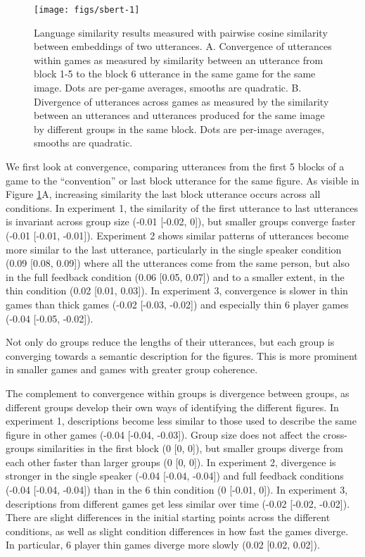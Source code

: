 \documentclass[
  english,
  a4paper,
]{article}
\begin{document}
\begin{figure}[t!]

{\centering \texttt{[image: figs/sbert-1]} 

}

\caption{Language similarity results measured with pairwise cosine similarity between embeddings of two utterances. A. Convergence of utterances within games as measured by similarity between an utterance from block 1-5 to the block 6 utterance in the same game for the same image. Dots are per-game averages, smooths are quadratic. B. Divergence of utterances across games as measured by the similarity between an utterances and utterances produced for the same image by different groups in the same block. Dots are per-image averages, smooths are quadratic.}\label{fig:sbert}
\end{figure}

We first look at convergence, comparing utterances from the first 5 blocks of a game to the ``convention'' or last block utterance for the same figure. As visible in Figure \ref{fig:sbert}A, increasing similarity the last block utterance occurs across all conditions. In experiment 1, the similarity of the first utterance to last utterances is invariant across group size (-0.01 {[}-0.02, 0{]}), but smaller groups converge faster (-0.01 {[}-0.01, -0.01{]}). Experiment 2 shows similar patterns of utterances become more similar to the last utterance, particularly in the single speaker condition (0.09 {[}0.08, 0.09{]}) where all the utterances come from the same person, but also in the full feedback condition (0.06 {[}0.05, 0.07{]}) and to a smaller extent, in the thin condition (0.02 {[}0.01, 0.03{]}). In experiment 3, convergence is slower in thin games than thick games (-0.02 {[}-0.03, -0.02{]}) and especially thin 6 player games (-0.04 {[}-0.05, -0.02{]}).

Not only do groups reduce the lengths of their utterances, but each group is converging towards a semantic description for the figures. This is more prominent in smaller games and games with greater group coherence.

The complement to convergence within groups is divergence between groups, as different groups develop their own ways of identifying the different figures. In experiment 1, descriptions become less similar to those used to describe the same figure in other games (-0.04 {[}-0.04, -0.03{]}). Group size does not affect the cross-groups similarities in the first block (0 {[}0, 0{]}), but smaller groups diverge from each other faster than larger groups (0 {[}0, 0{]}). In experiment 2, divergence is stronger in the single speaker (-0.04 {[}-0.04, -0.04{]}) and full feedback conditions (-0.04 {[}-0.04, -0.04{]}) than in the 6 thin condition (0 {[}-0.01, 0{]}). In experiment 3, descriptions from different games get less similar over time (-0.02 {[}-0.02, -0.02{]}). There are slight differences in the initial starting points across the different conditions, as well as slight condition differences in how fast the games diverge. In particular, 6 player thin games diverge more slowly (0.02 {[}0.02, 0.02{]}).
\end{document}

